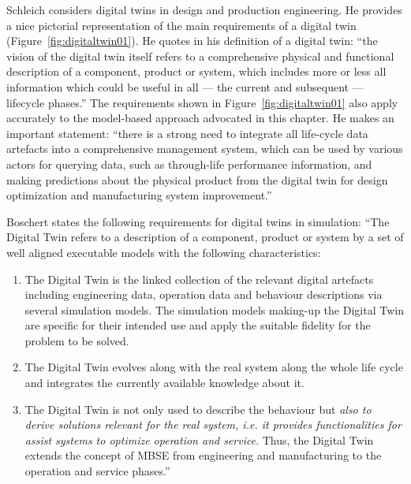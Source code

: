 Schleich \cite{Schleich-2017} considers digital twins in design and production engineering. He provides a nice pictorial representation of the main requirements of a digital twin (Figure~\ref{fig:digitaltwin01}).  He quotes \cite{Boschert2016} in his definition of a digital twin: ``the vision of the digital twin itself refers to a comprehensive physical and functional description of a component, product or system, which includes more or less all information which could be useful in all --- the current and subsequent --- lifecycle phases.''
The requirements shown in Figure~\ref{fig:digitaltwin01} also apply accurately to the model-based approach advocated in this chapter.  He makes an important statement: 
``there is a strong need to integrate all life-cycle data artefacts into a comprehensive management system, which can be used by various actors for querying data, such as through-life performance
information, and making predictions about the physical product from the digital twin for design optimization and manufacturing system improvement.''  


Boschert \cite{Boschert2016} states the following requirements for digital twins in simulation:
``The Digital Twin refers to a description of a component, product or system by a set of well aligned executable models with the following characteristics:
\begin{enumerate}
\item The Digital Twin is the linked collection of the relevant digital artefacts including engineering data, operation data and behaviour descriptions via several simulation models.  The simulation models making-up the Digital Twin are specific for their intended use and apply the suitable fidelity for the problem to be solved.

\item The Digital Twin evolves along with the real system along the whole life cycle and integrates the currently available knowledge about it.

\item  The Digital Twin is not only used to describe the behaviour but \textit{also to derive solutions relevant for the real system, i.e. it provides functionalities for assist systems to optimize operation and service}. Thus, the Digital Twin extends the concept of \ac{MBSE} from engineering and manufacturing to the operation and service phases.''
\end{enumerate}




